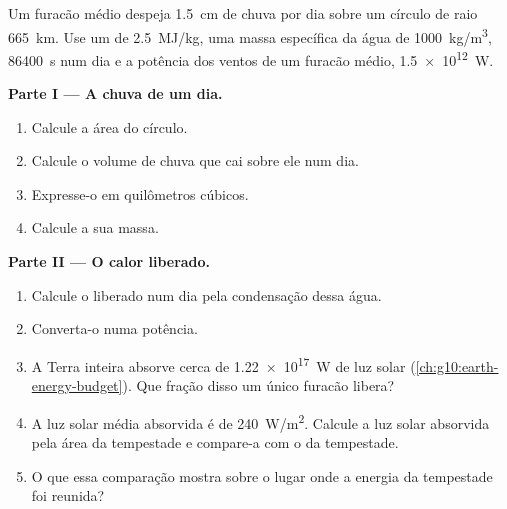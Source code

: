 \begin{problem}
\label{pb:g10:storms-and-cyclones:1}
Um furacão médio despeja \qty{1.5}{cm} de chuva por dia sobre um círculo de
raio \qty{665}{km}. Use um  de \qty{2.5}{MJ/kg}, uma massa
específica da água de \qty{1000}{kg/m^3}, \qty{86400}{s} num dia e a
potência dos ventos de um furacão médio, \qty{1.5e12}{W}.

\medskip
\noindent\textbf{Parte I --- A chuva de um dia.}
\begin{enumerate}
  \item Calcule a área do círculo.
  \item Calcule o volume de chuva que cai sobre ele num dia.
  \item Expresse-o em quilômetros cúbicos.
  \item Calcule a sua massa.
\end{enumerate}

\medskip
\noindent\textbf{Parte II --- O calor liberado.}
\begin{enumerate}[resume]
  \item Calcule o  liberado num dia pela condensação dessa
        água.
  \item Converta-o numa potência.
  \item A Terra inteira absorve cerca de \qty{1.22e17}{W} de luz solar
        (\cref{ch:g10:earth-energy-budget}). Que fração disso um único
        furacão libera?
  \item A luz solar média absorvida é de \qty{240}{W/m^2}. Calcule a luz
        solar absorvida pela área da tempestade e compare-a com o  da tempestade.
  \item O que essa comparação mostra sobre o lugar onde a energia da
        tempestade foi reunida?
\end{enumerate}


\end{problem}
